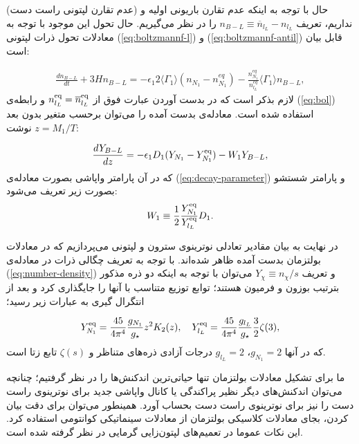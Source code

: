 \documentclass[a4paper]{book}
\begin{document}
حال با توجه به اینکه عدم تقارن باریونی اولیه و (عدم تقارن لپتونی راست دست) نداریم، تعریف {\footnotesize$n_{B-L} \equiv \overline{n}_{l_L}-n_{l_L}$} را در نظر می‌گیریم. 
حال تحول این موجود با توجه به معادلات تحول ذرات لپتونی (\ref{eq:boltzmannf-l}) و (\ref{eq:boltzmannf-antil}) قابل بیان است:
\par
\vspace{-0.5cm}
{\footnotesize\begin{align}
	\frac{dn_{{B-L}}}{dt}+3Hn_{{B-L}} = - \epsilon_1 2 \langle\Gamma_1\rangle (n_{N_1}-n_{N_1}^{eq}) - \frac{n_{N_1}^{eq}}{n_{l_L}^{eq}} \langle\Gamma_1\rangle n_{B-L},
\end{align}}
لازم بذکر است که در بدست آوردن عبارت فوق از {\footnotesize$n_{l_L}^{\rm eq} = \overline{n}_{l_L}^{\rm eq}$} و رابطه‌ی (\ref{eq:bol}) استفاده شده است.
معادله‌ی بدست آمده را می‌توان برحسب متغیر بدون بعد {\footnotesize$z=M_1/T$} نوشت:
\par
\vspace{-0.5cm}
{\footnotesize\begin{align}
	\frac{dY_{B-L}}{dz} = - \epsilon_1 D_1 (Y_{N_1} - Y_{N_1}^{\rm eq}) - W_1 Y_{B-L},
	\label{eq:boltzmann-BL}
\end{align}}
که در آن پارامتر واپاشی بصورت معادله‌ی (\ref{eq:decay-parameter}) و پارامتر شستشو بصورت زیر تعریف می‌شود:
{\footnotesize\begin{align}
	W_1 \equiv \frac{1}{2} \frac{Y_{N_1}^{\rm eq}}{Y_{l_L}^{\rm eq}} D_1.
	\label{eq:washout-parameter}
\end{align}}

در نهایت به بیان مقادیر تعادلی نوترینوی سترون و لپتونی می‌پردازیم که در معادلات بولتزمان بدست آمده ظاهر شده‌اند. با توجه به تعریف چگالی ذرات در معادله‌ی (\ref{eq:number-density}) و تعریف {\footnotesize$Y_{\chi}\equiv n_{\chi}/s$} می‌توان با توجه به اینکه دو ذره مذکور بترتیب بوزون و فرمیون هستند؛ توابع توزیع متناسب با آنها را جایگذاری کرد و بعد از انتگرال گیری به عبارات زیر رسید؛
\par
\vspace{-0.5cm}
{\footnotesize\begin{align}
		Y_{N_1}^{\rm eq} = \frac{45}{4\pi^4} \frac{g_{N_1}}{g_{\star}} z^2 K_2(z), \quad
		Y_{l_L}^{\rm eq} = \frac{45}{4\pi^4} \frac{g_{l_L}}{g_{\star}} \frac{3}{2} \zeta(3),
\end{align}}
که در آنها {\footnotesize$g_{N_1} =2$}، {\footnotesize$g_{l_L} = 2$} درجات آزادی ذره‌های متناظر و {\footnotesize$\zeta(s)$} تابع زتا است.

ما برای تشکیل معادلات بولتزمان تنها حیاتی‌ترین اندکنش‌ها را در نظر گرفتیم؛ چنانچه می‌توان اندکنش‌های دیگر نظیر پراکندگی یا کانال واپاشی جدید برای نوترینوی راست دست را نیز برای نوترینوی راست دست بحساب آورد. همینطور می‌توان برای دقت بیان کردن، بجای معادلات کلاسیکی بولتزمان از معادلات سینماتیکی کوانتومی استفاده کرد. این نکات عموما در تعمیم‌های لپتون‌زایی گرمایی در نظر گرفته شده است.
\end{document}
